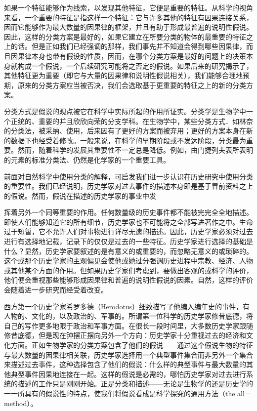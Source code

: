 如果一个特征能够作为线索，以发现其他特征，它便是重要的特征。从科学的视角来看，一个重要的特征是指这样一个特征：它与许多其他的特征有因果连接关系，因而它能够作为最大数量的因果律的框架，并且有助于形成最普遍的说明性假说。因此，这样的分类方案是最好的，如果它建立在所要分类的物体的最重要的特征之上的话。但是正如我们已经强调的那样，我们事先并不知道会得到哪些因果律，而且因果律本身也带有假设的性质，因而，在哪个分类方案是最好的问题上的决策本身就构成一个假说，一个后续研究可能将之否定的假说。如果后来的研究揭示了，其他特征更为重要（即它与大量的因果律和说明性假说相关），我们能够合理地预期，原来的分类方案应当被否决，我们会选取基于更重要的特征之上的新的分类方案。

分类方式是假说的观点被它在科学中实际所起的作用所证实。分类学是生物学中一个正统的、重要的并且欣欣向荣的分支学科。在生物学中，某些分类方式．如林奈的分类法，被采纳、使用，后来因有了更好的方案而被弃用；更好的方案本身在新的数据下也经受着修改。一般来说，在科学的早期阶段或不发达阶段，分类最为重要。然而，随着科学的发展其重要性不一定总是降低。例如，由门捷列夫表所表明的元素的标准分类法、仍然是化学家的一个重要工具。

前面对自然科学中使用分类的解释，可启发我们进一步认识在历史研究中使用分类的重要性。我们已经说明，历史学家对过去事件的描述本身即是基于冒前资料之上的假说。然而，假说在描述的历史学家的事业中发

挥着另外一个同等重要的作用。任何数量级的历史事件都不能被完完全全地描述。即使人们能够知道它的所有细节，历史学家也不可能将之全部写进著作之中。生命过于短暂，它不允许人们对事物进行详尽无遗的描述。因此，历史学家必须对过去进行有选择地记载，记录下的仅仅是过去的一些特征。历史学家进行选择的基础是什么？显然，历史学家要叙述的是有意义的或重要的，而忽略无意义的或琐碎的。这个或那个历史学家的主观偏见会使他或她过分强调历史进程中宗教、经济、人物或其他某个方面的作用。但如果历史学家们考虑到，要做出客观的或科学的评价，他们便会重视那些能够形成因果律和普遍的说明性假说的因素。自然，这样的评价会随着进一步研究而经受着改变。

西方第一个历史学家希罗多德（Herodotus）细致描写了他编入编年史的事件，有人物的、文化的，以及政治的、军事的。所谓第一位科学的历史学家修昔底德，将自己的写作更多地限于政治和军事方面。在很长一段时间里，大多数历史学家跟随修昔底德，但是现在钟摆正摆向另外一个方向：历史学家十分重视过去的经济和文化方面。正如生物学家的分类方案包含了他们的假说——通过这个假说生物的特征与最大数量的因果律相关联，历史学家选择用一个典型事件集合而非另外一个集合来描述过去事件，这种选择包含了他们的假说：什么样的典型事件与最大数量的其他典型事件因果地连接在一起。这样的假说是必需的，哪怕历史学家对过去进行系统的描述的工作只是刚刚开始。正是分类和描述——无论是生物学的还是历史学的一一所具有的假说性的特点，使我们将假说看成是科学探究的通用方法（the all－method）。

